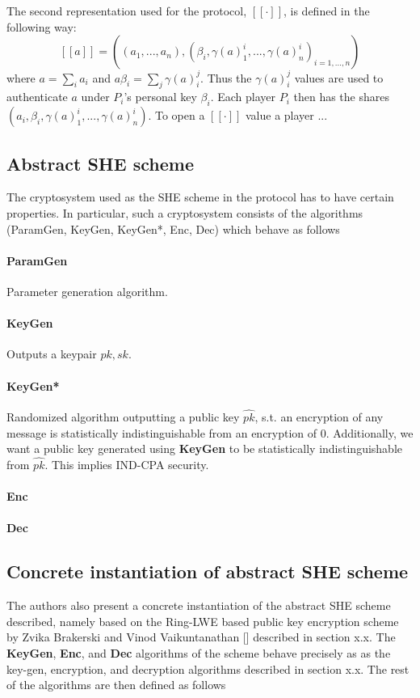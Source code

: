 \documentclass{article}
\begin{document}
The second representation used for the protocol, $[\![ \cdot ]\!]$, is defined in the following way:
$$[\![ a ]\!] = ((a_1, ..., a_n), (\beta_i, \gamma(a)^i_1, ..., \gamma(a)^i_n)_{i = 1, ..., n})$$
where $a = \sum_i a_i$ and $a\beta_i = \sum_j \gamma(a)^j_i$. Thus the $\gamma(a)^j_i$ values are used to authenticate $a$ under $P_i$'s personal key $\beta_i$. Each player $P_i$ then has the shares $(a_i, \beta_i, \gamma(a)^i_1, ..., \gamma(a)^i_n)$. To open a $[\![ \cdot ]\!]$ value a player ...

\subsection{Abstract SHE scheme}
The cryptosystem used as the SHE scheme in the protocol has to have certain properties. In particular, such a cryptosystem consists of the algorithms (ParamGen, KeyGen, KeyGen*, Enc, Dec) which behave as follows
\paragraph{ParamGen} Parameter generation algorithm.
\paragraph{KeyGen}
Outputs a keypair $pk, sk$.
\paragraph{KeyGen*} Randomized algorithm outputting a public key $\widehat{pk}$, s.t. an encryption of any message is statistically indistinguishable from an encryption of 0. Additionally, we want a public key generated using \textbf{KeyGen} to be statistically indistinguishable from $\widehat{pk}$. This implies IND-CPA security.
\paragraph{Enc} 
\paragraph{Dec}

\subsection{Concrete instantiation of abstract SHE scheme}
The authors also present a concrete instantiation of the abstract SHE scheme described, namely based on the Ring-LWE based public key encryption scheme by Zvika Brakerski and Vinod Vaikuntanathan [] described in section x.x. The \textbf{KeyGen}, \textbf{Enc}, and \textbf{Dec} algorithms of the scheme behave precisely as as the key-gen, encryption, and decryption algorithms described in section x.x. %
The rest of the algorithms are then defined as follows
\end{document}
